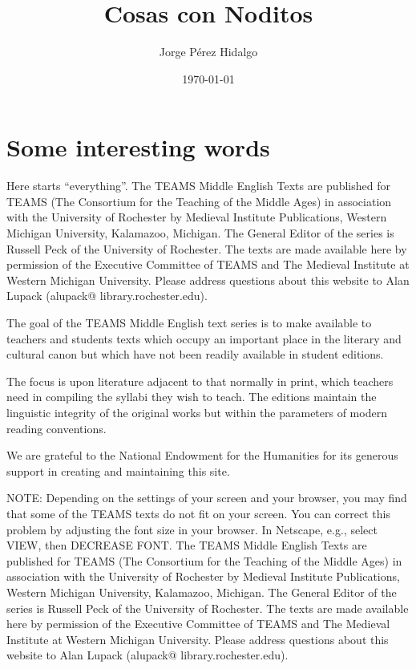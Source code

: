 

\author{Jorge P\'erez Hidalgo}
\title{Cosas con Noditos}
\date{\today}

\marginsize{3cm}{2cm}{2cm}{2cm}





\pagestyle{plain}

\frontmatter

\tableofcontents

\mainmatter
\chapter{Some interesting words}
Here starts ``everything''.
The TEAMS Middle English Texts are published for TEAMS (The Consortium for the Teaching of the Middle Ages) in association with the University of Rochester by Medieval Institute Publications, Western Michigan University, Kalamazoo, Michigan. The General Editor of the series is Russell Peck of the University of Rochester. The texts are made available here by permission of the Executive Committee of TEAMS and The Medieval Institute at Western Michigan University. Please address questions about this website to Alan Lupack (alupack@ library.rochester.edu).

The goal of the TEAMS Middle English text series is to make available to teachers and students texts which occupy an important place in the literary and cultural canon but which have not been readily available in student editions.

The focus is upon literature adjacent to that normally in print, which teachers need in compiling the syllabi they wish to teach. The editions maintain the linguistic integrity of the original works but within the parameters of modern reading conventions.

We are grateful to the National Endowment for the Humanities for its generous support in creating and maintaining this site.

NOTE: Depending on the settings of your screen and your browser, you may find that some of the TEAMS texts do not fit on your screen. You can correct this problem by adjusting the font size in your browser. In Netscape, e.g., select VIEW, then DECREASE FONT.
The TEAMS Middle English Texts are published for TEAMS (The Consortium for the Teaching of the Middle Ages) in association with the University of Rochester by Medieval Institute Publications, Western Michigan University, Kalamazoo, Michigan. The General Editor of the series is Russell Peck of the University of Rochester. The texts are made available here by permission of the Executive Committee of TEAMS and The Medieval Institute at Western Michigan University. Please address questions about this website to Alan Lupack (alupack@ library.rochester.edu).

